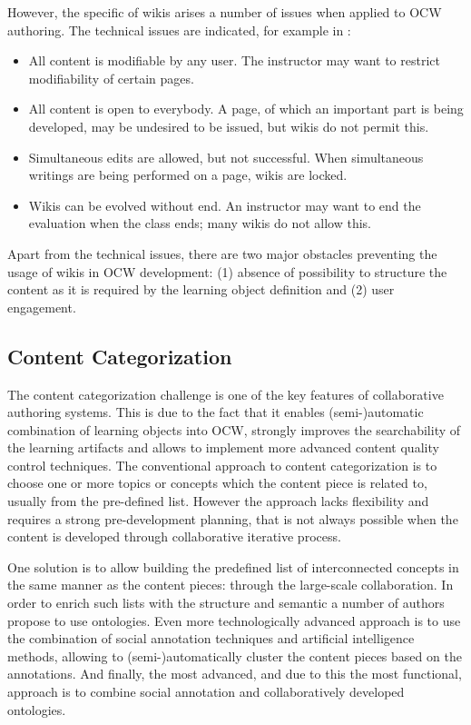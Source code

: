 \documentclass[ngerman,UKenglish,table]{scrbook}
\begin{document}
However, the specific of wikis arises a number of issues when applied to OCW authoring. 
The technical issues are indicated, for example in \cite{wang2004extending, elrufaie2005wiki}:
\begin{itemize}
\item All content is modifiable by any user. The instructor may want to restrict modifiability of certain pages.
\item All content is open to everybody. A page, of which an important part is being developed, may be undesired to be issued, but wikis do not permit this.
\item Simultaneous edits are allowed, but not successful. When simultaneous writings are being performed on a page, wikis are locked.
\item Wikis can be evolved without end. An instructor may want to end the evaluation when the class ends; many wikis do not allow this.
\end{itemize}

Apart from the technical issues, there are two major obstacles preventing the usage of wikis in OCW development: (1) absence of possibility to structure the content as it is required by the learning object definition and (2) user engagement.


\subsection{Content Categorization}

The content categorization challenge is one of the key features of collaborative authoring systems.
This is due to the fact that it enables (semi-)automatic combination of learning objects into OCW, strongly improves the searchability of the learning artifacts and allows to implement more advanced content quality control techniques.
The conventional approach to content categorization is to choose one or more topics or concepts which the content piece is related to, usually from the pre-defined list.
However the approach lacks flexibility and requires a strong pre-development planning, that is not always possible when the content is developed through collaborative iterative process.

One solution is to allow building the predefined list of interconnected concepts in the same manner as the content pieces: through the large-scale collaboration.
In order to enrich such lists with the structure and semantic a number of authors propose to use ontologies.
Even more technologically advanced approach is to use the combination of social annotation techniques and artificial intelligence methods, allowing to (semi-)automatically cluster the content pieces based on the annotations.
And finally, the most advanced, and due to this the most functional, approach is to combine social annotation and collaboratively developed ontologies. 
\end{document}

